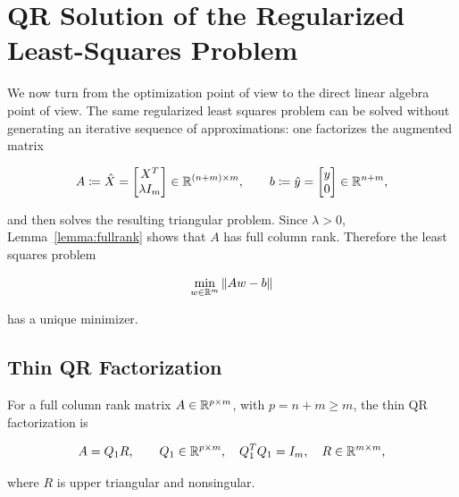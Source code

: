 \label{sec:qr}

\section{QR Solution of the Regularized Least-Squares Problem}
\label{sec:qr_solution}

\noindent We now turn from the optimization point of view to the direct linear algebra point 
of view. The same regularized least squares problem can be solved without generating 
an iterative sequence of approximations: one factorizes the augmented matrix

\begin{equation}
    A \coloneqq \hat{X} =
    \begin{bmatrix}
        X^T \\ \lambda I_m
    \end{bmatrix}
    \in \mathbb{R}^{(n+m)\times m},
    \qquad
    b \coloneqq \hat{y} =
    \begin{bmatrix}
        y \\ 0
    \end{bmatrix}
    \in \mathbb{R}^{n+m},
\end{equation}

\noindent and then solves the resulting triangular problem. Since $\lambda > 0$, 
Lemma~\ref{lemma:fullrank} shows that $A$ has full column rank. Therefore the 
least squares problem

\begin{equation}
    \min_{w\in\mathbb{R}^m} \left\|Aw-b\right\|
\end{equation}

\noindent has a unique minimizer.

\subsection{Thin QR Factorization}

\noindent For a full column rank matrix $A\in\mathbb{R}^{p\times m}$, with $p=n+m\geq m$, the thin QR 
factorization is

\begin{equation}
\label{eq:thin_qr}
    A = Q_1 R,
    \qquad
    Q_1 \in \mathbb{R}^{p\times m}, \quad Q_1^T Q_1 = I_m,
    \quad
    R \in \mathbb{R}^{m\times m},
\end{equation}

\noindent where $R$ is upper triangular and nonsingular.


